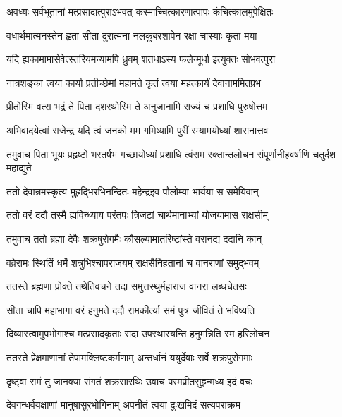 \twolineshloka
{अवध्यः सर्वभूतानां मत्प्रसादात्पुराऽभवत्}
{कस्माच्चित्कारणात्पापः कंचित्कालमुपेक्षितः}


\twolineshloka
{वधार्थमात्मनस्तेन हृता सीता दुरात्मना}
{नलकूबरशापेन रक्षा चास्याः कृता मया}


\twolineshloka
{यदि ह्यकामामासेवेत्स्तरियमन्यामपि ध्रुवम्}
{शतधाऽस्य फलेन्मूर्धा इत्युक्तः सोभवत्पुरा}


\twolineshloka
{नात्रशङ्का त्वया कार्या प्रतीच्छेमां महामते}
{कृतं त्वया महत्कार्यं देवानाममितप्रभ}



\twolineshloka
{प्रीतोस्मि वत्स भद्रं ते पिता दशरथोस्मि ते}
{अनुजानामि राज्यं च प्रशाधि पुरुषोत्तम}



\twolineshloka
{अभिवादयेत्वां राजेन्द्र यदि त्वं जनको मम}
{गमिष्यामि पुरीं रम्यामयोध्यां शासनात्तव}



\threelineshloka
{तमुवाच पिता भूयः प्रहृष्टो भरतर्षभ}
{गच्छायोध्यां प्रशाधि त्वंराम रक्तान्तलोचन}
{संपूर्णानीहवर्षाणि चतुर्दश महाद्युते}


\twolineshloka
{ततो देवान्नमस्कृत्य मुहृद्भिरभिनन्दितः}
{महेन्द्रइव पौलोम्या भार्यया स समेयिवान्}


\twolineshloka
{ततो वरं ददौ तस्मै ह्यविन्ध्याय परंतपः}
{त्रिजटां चार्थमानाभ्यां योजयामास राक्षसीम्}


\twolineshloka
{तमुवाच ततो ब्रह्मा देवैः शक्रषुरोगमैः}
{कौसल्यामातरिष्टांस्ते वरानद्य ददानि कान्}


\twolineshloka
{वव्रेरामः स्थितिं धर्मे शत्रुभिश्चापराजयम्}
{राक्षसैर्निहतानां च वानराणां समुद्भवम्}


\twolineshloka
{ततस्ते ब्रह्मणा प्रोक्ते तथेतिवचने तदा}
{समुत्तस्थुर्महाराज वानरा लब्धचेतसः}


\twolineshloka
{सीता चापि महाभागा वरं हनुमते ददौ}
{रामकीर्त्या समं पुत्र जीवितं ते भविष्यति}


\twolineshloka
{दिव्यास्त्वामुपभोगाश्च मत्प्रसादकृताः सदा}
{उपस्थास्यन्ति हनुमन्निति स्म हरिलोचन}


\twolineshloka
{ततस्ते प्रेक्षमाणानां तेपामक्लिष्टकर्मणाम्}
{अन्तर्धानं ययुर्देवाः सर्वे शक्रपुरोगमाः}


\twolineshloka
{दृष्ट्वा रामं तु जानक्या संगतं शक्रसारथिः}
{उवाच परमप्रीतसुहृन्मध्य इदं वचः}


\twolineshloka
{देवगन्धर्वयक्षाणां मानुषासुरभोगिनाम्}
{अपनीतं त्वया दुःखमिदं सत्यपराक्रम}


